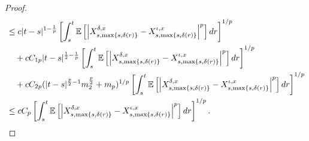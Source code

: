 \documentclass[11pt]{article}
\theoremstyle{theorem}
\theoremstyle{definition}
\newcommand{\1}{{\bf 1}}
\begin{document}
\begin{proof}
\begin{align}
  & \le c |t-s|^{1-\frac{1}{p}} \left[ \int_s^t \mathbb{E} \left[ \left| X_{s,\max\{s,\delta(r)\}}^{\delta,x} -X_{s,\max\{s,\delta(r)\}}^{\iota,x} \right|^p\right] dr \right]^{1/p}\notag \\ 
 & \quad + c C_{1p} |t-s|^{\frac{1}{2}-\frac{1}{p} } \left[ \int_s^t \mathbb{E} \left[ \left| X_{s,\max\{s,\delta(r)\}}^{\delta,x} -X_{s,\max\{s,\delta(r)\}}^{\iota,x} \right|^p\right] dr \right]^{1/p}\notag \\ 
 & \quad + c C_{2p} (|t-s|^{\frac{p}{2}-1}m_2^{\frac{p}{2}}+m_p )^{1/p} \left[ \int_s^t \mathbb{E} \left[ \left| X_{s,\max\{s,\delta(r)\}}^{\delta,x} -X_{s,\max\{s,\delta(r)\}}^{\iota,x} \right|^p\right] dr \right]^{1/p}\notag \\
 & \le c C_p \left[ \int_s^t \mathbb{E} \left[ \left| X_{s,\max\{s,\delta(r)\}}^{\delta,x} -X_{s,\max\{s,\delta(r)\}}^{\iota,x} \right|^p\right] dr \right]^{1/p}.
 \label{P1}
\end{align}



\end{proof}
\end{document}
